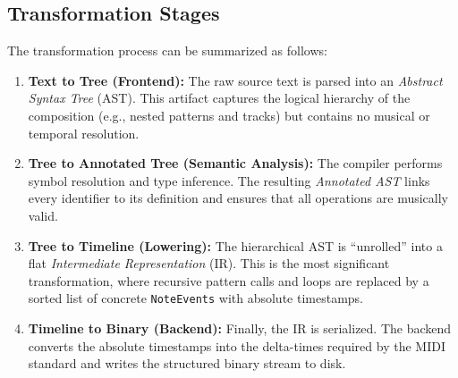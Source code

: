 \subsection{Transformation Stages}\label{subsec:transformation-stages}

The transformation process can be summarized as follows:

\begin{enumerate}
  \item \textbf{Text to Tree (Frontend):} The raw source text is parsed into an \textit{Abstract Syntax Tree} (AST).
    This artifact captures the logical hierarchy of the composition (e.g., nested patterns and tracks) but contains no
    musical or temporal resolution.
  \item \textbf{Tree to Annotated Tree (Semantic Analysis):} The compiler performs symbol resolution and type inference.
    The resulting \textit{Annotated AST} links every identifier to its definition and ensures that all operations are
    musically valid.
  \item \textbf{Tree to Timeline (Lowering):} The hierarchical AST is ``unrolled'' into a flat \textit{Intermediate
    Representation} (IR).
    This is the most significant transformation, where recursive pattern calls and loops are replaced by a sorted list
    of concrete \texttt{NoteEvents} with absolute timestamps.
  \item \textbf{Timeline to Binary (Backend):} Finally, the IR is serialized.
    The backend converts the absolute timestamps into the delta-times required by the MIDI standard and writes the
    structured binary stream to disk.
\end{enumerate}

